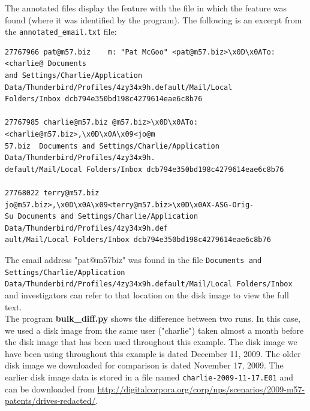 The annotated files display the feature with the file in which the feature was found (where it was identified by the program). The following is an excerpt from the \texttt{annotated\_email.txt} file:
\lstset{style=customfile}
\begin{lstlisting}
27767966 pat@m57.biz	m: "Pat McGoo" <pat@m57.biz>\x0D\x0ATo: <charlie@ Documents 
and Settings/Charlie/Application Data/Thunderbird/Profiles/4zy34x9h.default/Mail/Local 
Folders/Inbox dcb794e350bd198c4279614eae6c8b76

27767985 charlie@m57.biz @m57.biz>\x0D\x0ATo: <charlie@m57.biz>,\x0D\x0A\x09<jo@m
57.biz	Documents and Settings/Charlie/Application Data/Thunderbird/Profiles/4zy34x9h.
default/Mail/Local Folders/Inbox dcb794e350bd198c4279614eae6c8b76

27768022 terry@m57.biz jo@m57.biz>,\x0D\x0A\x09<terry@m57.biz>\x0D\x0AX-ASG-Orig-
Su Documents and Settings/Charlie/Application Data/Thunderbird/Profiles/4zy34x9h.def
ault/Mail/Local Folders/Inbox dcb794e350bd198c4279614eae6c8b76
\end{lstlisting}
The email address "pat@m57biz" was found in the file \texttt{Documents and Settings/Charlie/}\newline\texttt{Application Data/Thunderbird/Profiles/4zy34x9h.default/Mail/Local Folders/Inbox} and investigators can refer to that location on the disk image to view the full text.\\

The program \textbf{bulk\_diff.py} shows the difference between two \bulk runs. In this case, we used a disk image from the same user ("charlie") taken almost a month before the disk image that has been used throughout this example. The disk image we have been using throughout this example is dated December 11, 2009. The older disk image we downloaded for comparison is dated November 17, 2009.  The earlier disk image data is stored in a file named \texttt{charlie-2009-11-17.E01} and can be downloaded from \url{http://digitalcorpora.org/corp/nps/scenarios/2009-m57-patents/drives-redacted/}.\\

